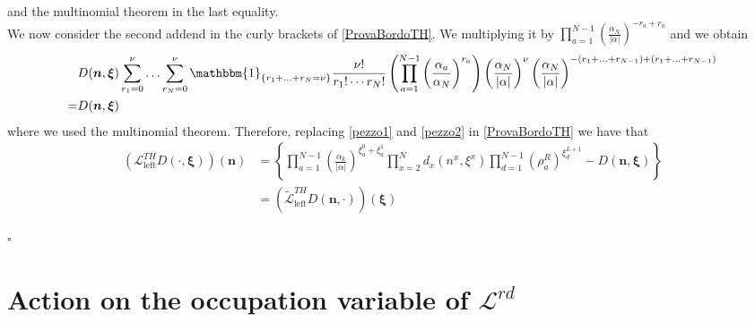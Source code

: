\documentclass[10pt]{article}
\numberwithin{equation}{section}
\numberwithin{equation}{subsection}
\begin{document}
and the multinomial theorem in the last equality. \\ We now consider the second addend in the curly brackets of \eqref{ProvaBordoTH}.
We multiplying it by $\prod_{a=1}^{N-1}\left(\frac{\alpha_{N}}{|\alpha|}\right)^{-r_{a}+r_{a}}$ and we obtain
\begin{equation}\label{pezzo2}
	\begin{split}
		&D(\bm{n},\bm{\xi})\sum_{r_{1}=0}^{\nu}\ldots\sum_{r_{N}=0}^{\nu}\mathbbm{1}_{\{r_{1}+\ldots+r_{N}=\nu\}}\frac{\nu!}{r_{1}!\cdots r_{N}!}\left(\prod_{a=1}^{N-1}\left(\frac{\alpha_{a}}{\alpha_{N}}\right)^{r_{a}}\right)\left(\frac{\alpha_{N}}{|\alpha|}\right)^{\nu}\left(\frac{\alpha_{N}}{|\alpha|}\right)^{-(r_{1}+\ldots+r_{N-1})+(r_{1}+\ldots+r_{N-1})}\\=&D(\bm{n},\bm{\xi})
	\end{split}
\end{equation}
where we used the multinomial theorem. Therefore, replacing \eqref{pezzo1} and \eqref{pezzo2} in \eqref{ProvaBordoTH} we have that
\begin{align}
	\left(\mathcal{L}_{\text{left}}^{TH}D(\cdot,\bm{\xi})\right)(\bm{n})&=\left\{\prod_{a=1}^{N-1}\left(\frac{\alpha_{k}}{|\alpha|}\right)^{\xi_{a}^{0}+\xi_{a}^{1}}\prod_{x=2}^{N}d_{x}(n^{x},\xi^{x})\prod_{d=1}^{N-1}(\rho_{a}^{R})^{\xi_{d}^{L+1}}-D(\bm{n},\bm{\xi})\right\}
	\\&=
	\left(\widetilde{\mathcal{L}}_{\text{left}}^{TH}D(\bm{n},\cdot)\right)(\bm{\xi})
\end{align}
\begin{flushright}
	$\square$
\end{flushright}
\section{Action on the occupation variable of $\mathcal{L}^{rd}$}\label{appendix-RD}
\end{document}
